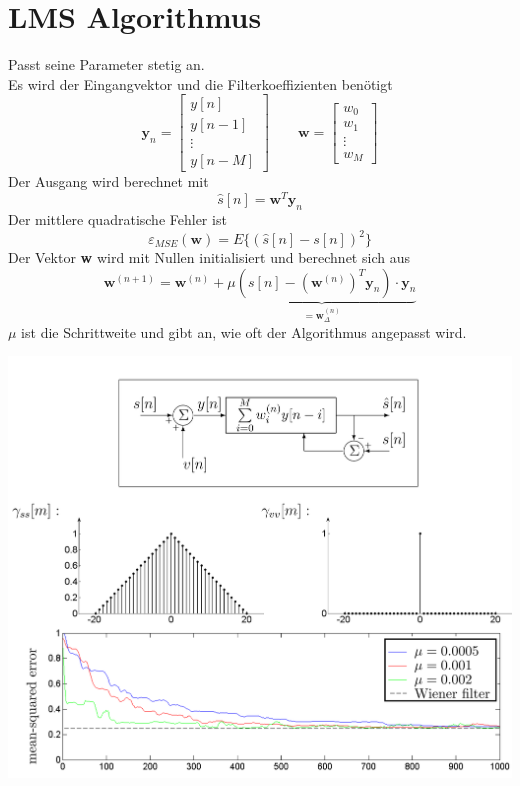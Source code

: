 \section{LMS Algorithmus}
Passt seine Parameter stetig an.\\
Es wird der Eingangvektor und die Filterkoeffizienten benötigt
\[ \textbf{y}_n = \begin{bmatrix}y[n] \\ y[n-1] \\ \vdots \\ y[n-M]
	\end{bmatrix} \qquad \textbf{w} = \begin{bmatrix}
		w_0 \\ w_1 \\ \vdots \\ w_M	\end{bmatrix} \]
Der Ausgang wird berechnet mit
\[ \hat{s}[n] = \textbf{w}^T\textbf{y}_n \]
Der mittlere quadratische Fehler ist
\[ \varepsilon_{MSE}(\textbf{w}) = E \{ (\hat{s}[n]-s[n])^2 \} \]
Der Vektor \textbf{w} wird mit Nullen initialisiert und berechnet sich aus
\[ \textbf{w}^{(n+1)} = \textbf{w}^{(n)} + \underbrace{\mu\left( s[n] - 
	\left( \textbf{w}^{(n)}\right)^T\textbf{y}_n\right)\cdot\textbf{y}_n}_
	{=\textbf{w}_\Delta^{(n)}} \]
$\mu$ ist die Schrittweite und gibt an, wie oft der Algorithmus angepasst wird.
\begin{center}
	\includegraphics[scale=.7]{../fig/lms_algorithm}
\end{center}
